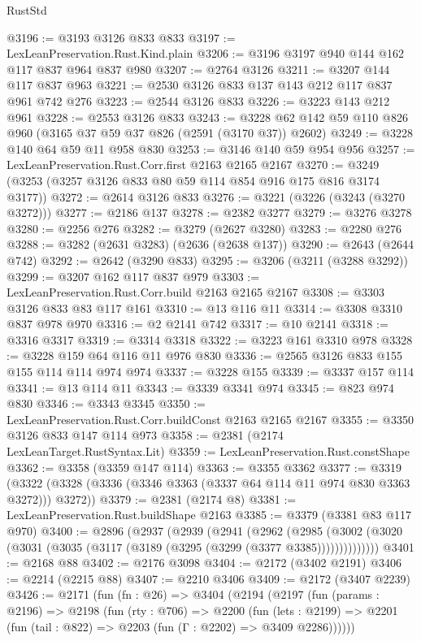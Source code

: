 \begin{lexlean}{RustStd}
\begin{coremodule}
@3196 := @3193 @3126 @833 @833
@3197 := LexLeanPreservation.Rust.Kind.plain
@3206 := @3196 @3197 @940 @144 @162 @117 @837 @964 @837 @980
@3207 := @2764 @3126
@3211 := @3207 @144 @117 @837 @963
@3221 := @2530 @3126 @833 @137 @143 @212 @117 @837 @961 @742 @276
@3223 := @2544 @3126 @833
@3226 := @3223 @143 @212 @961
@3228 := @2553 @3126 @833
@3243 := @3228 @62 @142 @59 @110 @826 @960 (@3165 @37 @59 @37 @826 (@2591 (@3170 @37)) @2602)
@3249 := @3228 @140 @64 @59 @11 @958 @830
@3253 := @3146 @140 @59 @954 @956
@3257 := LexLeanPreservation.Rust.Corr.first @2163 @2165 @2167
@3270 := @3249 (@3253 (@3257 @3126 @833 @80 @59 @114 @854 @916 @175 @816 @3174 @3177))
@3272 := @2614 @3126 @833
@3276 := @3221 (@3226 (@3243 (@3270 @3272)))
@3277 := @2186 @137
@3278 := @2382 @3277
@3279 := @3276 @3278
@3280 := @2256 @276
@3282 := @3279 (@2627 @3280)
@3283 := @2280 @276
@3288 := @3282 (@2631 @3283) (@2636 (@2638 @137))
@3290 := @2643 (@2644 @742)
@3292 := @2642 (@3290 @833)
@3295 := @3206 (@3211 (@3288 @3292))
@3299 := @3207 @162 @117 @837 @979
@3303 := LexLeanPreservation.Rust.Corr.build @2163 @2165 @2167
@3308 := @3303 @3126 @833 @83 @117 @161
@3310 := @13 @116 @11
@3314 := @3308 @3310 @837 @978 @970
@3316 := @2 @2141 @742
@3317 := @10 @2141
@3318 := @3316 @3317
@3319 := @3314 @3318
@3322 := @3223 @161 @3310 @978
@3328 := @3228 @159 @64 @116 @11 @976 @830
@3336 := @2565 @3126 @833 @155 @155 @114 @114 @974 @974
@3337 := @3228 @155
@3339 := @3337 @157 @114
@3341 := @13 @114 @11
@3343 := @3339 @3341 @974
@3345 := @823 @974 @830
@3346 := @3343 @3345
@3350 := LexLeanPreservation.Rust.Corr.buildConst @2163 @2165 @2167
@3355 := @3350 @3126 @833 @147 @114 @973
@3358 := @2381 (@2174 LexLeanTarget.RustSyntax.Lit)
@3359 := LexLeanPreservation.Rust.constShape
@3362 := @3358 (@3359 @147 @114)
@3363 := @3355 @3362
@3377 := @3319
    (@3322 (@3328 (@3336 (@3346 @3363 (@3337 @64 @114 @11 @974 @830 @3363 @3272))) @3272))
@3379 := @2381 (@2174 @8)
@3381 := LexLeanPreservation.Rust.buildShape @2163
@3385 := @3379 (@3381 @83 @117 @970)
@3400 := @2896
    (@2937
      (@2939
        (@2941
          (@2962
            (@2985
              (@3002 (@3020 (@3031 (@3035 (@3117 (@3189 (@3295 (@3299 (@3377 @3385))))))))))))))
@3401 := @2168 @88
@3402 := @2176 @3098
@3404 := @2172 (@3402 @2191)
@3406 := @2214 (@2215 @88)
@3407 := @2210 @3406
@3409 := @2172 (@3407 @2239)
@3426 := @2171
    (fun (fn : @26) =>
    @3404
      (@2194
        (@2197
          (fun (params : @2196) =>
          @2198
            (fun (rty : @706) =>
            @2200
              (fun (lets : @2199) =>
              @2201 (fun (tail : @822) => @2203 (fun (Γ : @2202) => @3409 @2286))))))

\end{coremodule}
\end{lexlean}
